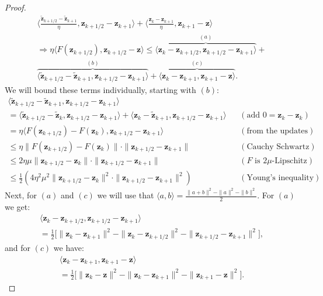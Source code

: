 \begin{proof}
\begin{align*}
    \Bigg \langle\frac{\tilde{\bm{z}}_{k+1/2}-\tilde{\bm{z}}_{k+1}}{\eta}, \bm{z}_{k+1/2} -\bm{z}_{k+1} \Bigg\rangle + 
    \Bigg \langle\frac{\bm{z}_k-{\bm{z}}_{k+1}}{\eta}, \bm{z}_{k+1} -\bm{z} \Bigg\rangle \\
    \Rightarrow \eta \langle F(\bm{z}_{k+1/2}), \bm{z}_{k+1/2} -\bm{z} \rangle \leq
    \overbrace{\langle \bm{z}_k-{\bm{z}}_{k+1/2}, \bm{z}_{k+1/2} -\bm{z}_{k+1} \rangle}^{(a)} + \\
    \overbrace{ \langle{\tilde{\bm{z}}_{k+1/2}-\tilde{\bm{z}}_{k+1}}, \bm{z}_{k+1/2} -\bm{z}_{k+1} \rangle}^{(b)} + 
    \overbrace{\langle {\bm{z}_k-{\bm{z}}_{k+1}}, \bm{z}_{k+1} -\bm{z} \rangle }^{(c)}.
\end{align*}
We will bound these terms individually, starting with $(b)$:
\begin{align*}
    \langle{\tilde{\bm{z}}_{k+1/2}-\tilde{\bm{z}}_{k+1}}, \bm{z}_{k+1/2} -\bm{z}_{k+1} \rangle \\
    =\langle{\tilde{\bm{z}}_{k+1/2}-\tilde{\bm{z}}_{k}}, \bm{z}_{k+1/2} -\bm{z}_{k+1} \rangle +
    \langle{{\bm{z}}_{k}-\tilde{\bm{z}}_{k+1}}, \bm{z}_{k+1/2} -\bm{z}_{k+1} \rangle  && (\text{add } 0 = \bm{z}_k - \bm{z}_k)\\
    = \eta \langle F(\bm{z}_{k+1/2})-F(\bm{z}_{k}), \bm{z}_{k+1/2} -\bm{z}_{k+1} \rangle  && (\text{from the updates})\\
    \leq \eta \| F(\bm{z}_{k+1/2})-F(\bm{z}_{k})\| \cdot \| \bm{z}_{k+1/2} -\bm{z}_{k+1} \|  && (\text{Cauchy Schwartz})\\
    \leq 2 \eta \mu \| \bm{z}_{k+1/2} - \bm{z}_{k} \| \cdot \| \bm{z}_{k+1/2} -\bm{z}_{k+1} \|  && (\text{$F$ is $2\mu$-Lipschitz})\\
    \leq \frac{1}{2}(4 \eta^2 \mu^2 \| \bm{z}_{k+1/2} - \bm{z}_{k} \|^2 \cdot \| \bm{z}_{k+1/2} -\bm{z}_{k+1} \|^2 ) && (\text{Young's inequality})
\end{align*}
Next, for $(a)$ and $(c)$ we will use that $\langle a, b \rangle = \frac{\|a+b\|^2-\|a\|^2-\|b\|^2}{2}$. For $(a)$ we get:
\begin{align*}
    \langle \bm{z}_k-{\bm{z}}_{k+1/2}, \bm{z}_{k+1/2} -\bm{z}_{k+1} \rangle \\
    =\frac{1}{2}\Big[ \| \bm{z}_k-{\bm{z}}_{k+1}\|^2 - \|  \bm{z}_k-{\bm{z}}_{k+1/2}\|^2 - \|  \bm{z}_{k+1/2}-{\bm{z}}_{k+1}\|^2 \Big],
\end{align*}
and for $(c)$ we have:
\begin{align*}
    \langle {\bm{z}_k-{\bm{z}}_{k+1}}, \bm{z}_{k+1} -\bm{z} \rangle
    \\ = \frac{1}{2}\Big[ \| \bm{z}_k-{\bm{z}}\|^2 - \|  \bm{z}_k-{\bm{z}}_{k+1}\|^2 - \|  \bm{z}_{k+1}-{\bm{z}}\|^2 \Big].

\end{align*}
\end{proof}
